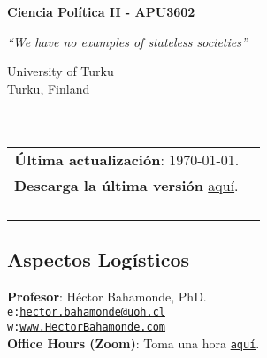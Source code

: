 \documentclass[letterpaper]{article}
\def\name{Ciencia Pol\'itica II - APU3602}
\begin{document}

\centerline{\huge \bf \name}

\epigraph{\emph{``We have no examples of stateless societies''}}{\textcite[195]{Mann1984}}


\vspace{0.25in}

\begin{minipage}{0.45\linewidth}
 University of Turku \\
  Turku, Finland\\
  \\
  \\

\end{minipage}
\hspace{4cm}\begin{minipage}{0.45\linewidth}
  \begin{tabular}{ll}
{\bf \'Ultima actualizaci\'on}: \today. \\
 {\bf Descarga la \'ultima versi\'on} \href{https://github.com/hbahamonde/Ciencia_Politica_II/raw/master/Bahamonde_Ciencia_Politica_II.pdf}{aqu\'i}.%
    \\
    \\
    \\
    \\
    \\
  \end{tabular}
\end{minipage}



\subsection*{Aspectos Log\'isticos}


\vspace{1mm}
{\bf Profesor}: H\'ector Bahamonde, PhD.\\
\texttt{e:}\href{mailto:hector.bahamonde@uoh.cl}{\texttt{hector.bahamonde@uoh.cl}}\\
\texttt{w:}\href{http://www.hectorbahamonde.com}{\texttt{www.HectorBahamonde.com}}\\
{\bf Office Hours (Zoom)}: Toma una hora \href{https://calendly.com/bahamonde/officehours}{\texttt{aqu\'i}}.
\end{document}
